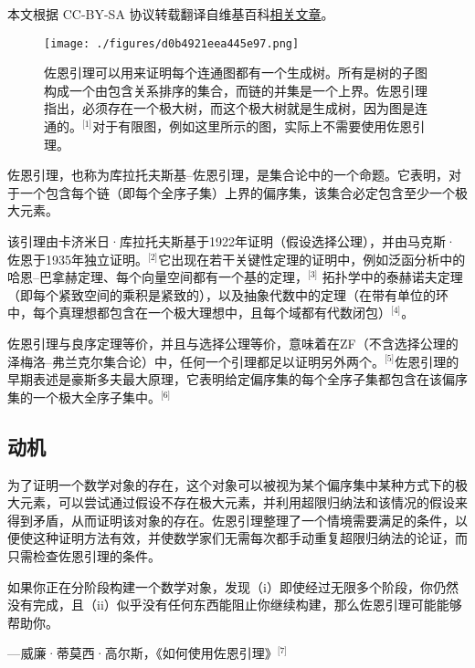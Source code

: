 
本文根据 CC-BY-SA 协议转载翻译自维基百科\href{https://en.wikipedia.org/wiki/Zorn\%27s_lemma}{相关文章}。

\begin{figure}[ht]
\centering
\texttt{[image: ./figures/d0b4921eea445e97.png]}
\caption{佐恩引理可以用来证明每个连通图都有一个生成树。所有是树的子图构成一个由包含关系排序的集合，而链的并集是一个上界。佐恩引理指出，必须存在一个极大树，而这个极大树就是生成树，因为图是连通的。\(^\text{[1]}\)对于有限图，例如这里所示的图，实际上不需要使用佐恩引理。} \label{fig_ZornS_1}
\end{figure}
佐恩引理，也称为库拉托夫斯基–佐恩引理，是集合论中的一个命题。它表明，对于一个包含每个链（即每个全序子集）上界的偏序集，该集合必定包含至少一个极大元素。

该引理由卡济米日·库拉托夫斯基于1922年证明（假设选择公理），并由马克斯·佐恩于1935年独立证明。\(^\text{[2]}\)它出现在若干关键性定理的证明中，例如泛函分析中的哈恩–巴拿赫定理、每个向量空间都有一个基的定理，\(^\text{[3]}\) 拓扑学中的泰赫诺夫定理（即每个紧致空间的乘积是紧致的），以及抽象代数中的定理（在带有单位的环中，每个真理想都包含在一个极大理想中，且每个域都有代数闭包）\(^\text{[4]}\)。

佐恩引理与良序定理等价，并且与选择公理等价，意味着在ZF（不含选择公理的泽梅洛–弗兰克尔集合论）中，任何一个引理都足以证明另外两个。\(^\text{[5]}\)佐恩引理的早期表述是豪斯多夫最大原理，它表明给定偏序集的每个全序子集都包含在该偏序集的一个极大全序子集中。\(^\text{[6]}\)
\subsection{动机}  
为了证明一个数学对象的存在，这个对象可以被视为某个偏序集中某种方式下的极大元素，可以尝试通过假设不存在极大元素，并利用超限归纳法和该情况的假设来得到矛盾，从而证明该对象的存在。佐恩引理整理了一个情境需要满足的条件，以便使这种证明方法有效，并使数学家们无需每次都手动重复超限归纳法的论证，而只需检查佐恩引理的条件。

如果你正在分阶段构建一个数学对象，发现（i）即使经过无限多个阶段，你仍然没有完成，且（ii）似乎没有任何东西能阻止你继续构建，那么佐恩引理可能能够帮助你。

— 威廉·蒂莫西·高尔斯，《如何使用佐恩引理》\(^\text{[7]}\)
